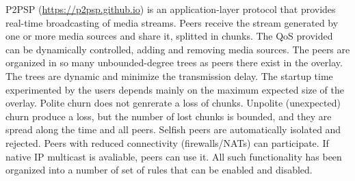 

P2PSP (\url{https://p2psp.github.io}) is an application-layer protocol
that provides real-time broadcasting of media streams. Peers receive
the stream generated by one or more media sources and share it,
splitted in chunks. The QoS provided can be dynamically controlled,
adding and removing media sources. The peers are organized in so many
unbounded-degree trees as peers there exist in the overlay. The trees
are dynamic and minimize the transmission delay. The startup time
experimented by the users depends mainly on the maximum expected size
of the overlay. Polite churn does not genrerate a loss of
chunks. Unpolite (unexpected) churn produce a loss, but the number of
lost chunks is bounded, and they are spread along the time and all
peers. Selfish peers are automatically isolated and rejected. Peers
with reduced connectivity (firewalls/NATs) can participate. If native
IP multicast is avaliable, peers can use it. All such functionality
has been organized into a number of set of rules that can be enabled
and disabled.
